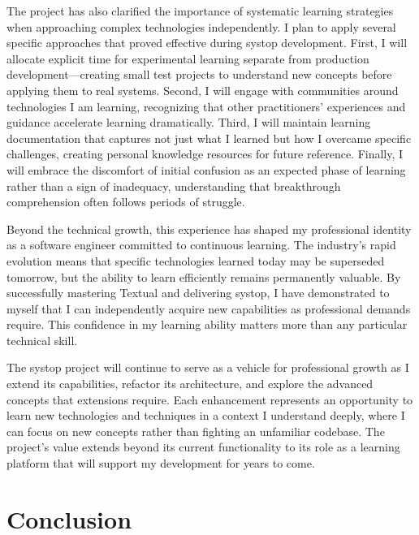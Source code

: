 \documentclass[12pt,a4paper]{article}
\begin{document}
The project has also clarified the importance of systematic learning strategies when approaching complex technologies independently. I plan to apply several specific approaches that proved effective during systop development. First, I will allocate explicit time for experimental learning separate from production development—creating small test projects to understand new concepts before applying them to real systems. Second, I will engage with communities around technologies I am learning, recognizing that other practitioners' experiences and guidance accelerate learning dramatically. Third, I will maintain learning documentation that captures not just what I learned but how I overcame specific challenges, creating personal knowledge resources for future reference. Finally, I will embrace the discomfort of initial confusion as an expected phase of learning rather than a sign of inadequacy, understanding that breakthrough comprehension often follows periods of struggle.

Beyond the technical growth, this experience has shaped my professional identity as a software engineer committed to continuous learning. The industry's rapid evolution means that specific technologies learned today may be superseded tomorrow, but the ability to learn efficiently remains permanently valuable. By successfully mastering Textual and delivering systop, I have demonstrated to myself that I can independently acquire new capabilities as professional demands require. This confidence in my learning ability matters more than any particular technical skill.

The systop project will continue to serve as a vehicle for professional growth as I extend its capabilities, refactor its architecture, and explore the advanced concepts that extensions require. Each enhancement represents an opportunity to learn new technologies and techniques in a context I understand deeply, where I can focus on new concepts rather than fighting an unfamiliar codebase. The project's value extends beyond its current functionality to its role as a learning platform that will support my development for years to come.

\section*{Conclusion}
\end{document}
